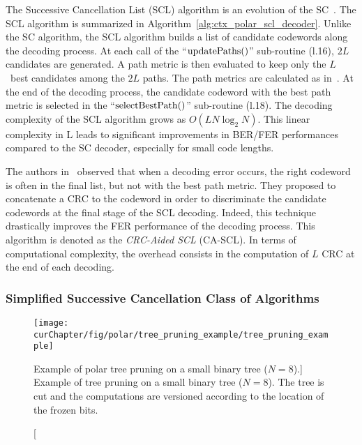 The Successive Cancellation List (SCL) algorithm is an evolution of the
SC~\cite{Tal2011}. The SCL algorithm is summarized in
Algorithm~\ref{alg:ctx_polar_scl_decoder}. Unlike the SC algorithm, the SCL
algorithm builds a list of candidate codewords along the decoding process. At
each call of the ``$\operatorname*{updatePaths}()$'' sub-routine (l.16), $2L$ candidates are
generated. A path metric is then evaluated to keep only the $L$~best candidates
among the $2L$ paths. The path metrics are calculated as
in~\cite{Balatsoukas-Stimming2015}. At the end of the decoding process, the
candidate codeword with the best path metric is selected in the
``$\operatorname*{selectBestPath}()$'' sub-routine (l.18). The decoding complexity of the
SCL algorithm grows as $O(LN\log_2N)$. This linear complexity in L leads to
significant improvements in BER/FER performances compared to the SC decoder,
especially for small code lengths.


The authors in~\cite{Tal2011} observed that when a decoding error occurs, the
right codeword is often in the final list, but not with the best path metric.
They proposed to concatenate a CRC to the codeword in order to discriminate the
candidate codewords at the final stage of the SCL decoding. Indeed, this
technique drastically improves the FER performance of the decoding process. This
algorithm is denoted as the \emph{CRC-Aided SCL} (CA-SCL). In terms of
computational complexity, the overhead consists in the computation of $L$ CRC at
the end of each decoding.

\subsubsection{Simplified Successive Cancellation Class of Algorithms}
\label{sec:ctx_polar_simplified_decoders}

\begin{figure}[htp]
  \centering
  \texttt{[image: \\curChapter/fig/polar/tree\_pruning\_example/tree\_pruning\_example]}
  \caption
    [Example of polar tree pruning on a small binary tree ($N = 8$).]
    {Example of tree pruning on a small binary tree ($N = 8$). The tree is cut
    and the computations are versioned according to the location of the frozen
    bits.}
  \label{fig:ctx_polar_tree_pruning_example}
\end{figure}

